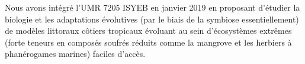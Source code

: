     Nous avons intégré l'UMR 7205 ISYEB en janvier 2019 en proposant d'étudier la biologie et les adaptations évolutives (par le biais de la symbiose essentiellement) de modèles littoraux côtiers tropicaux évoluant au sein d'écosystèmes extrêmes (forte teneurs en composés soufrés réduits comme la mangrove et les herbiers à phanérogames marines) faciles d'accès.